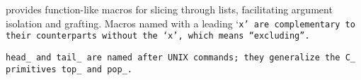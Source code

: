  provides function-like macros for slicing through lists,
facilitating argument isolation and grafting.
Macros named with a leading `\tt{x}' are complementary to their
counterparts without the `\tt{x}', which means ``e\textbf{\tt{x}}cluding''.

\note \tt{head_} and \tt{tail_} are named after UNIX commands;
they generalize the C\_ primitives \tt{top_} and \tt{pop_}.

\subsubsection{}


\subsubsection{}


\subsubsection{}


\subsubsection{}


\subsubsection{}


\subsubsection{}


\subsubsection{}


\subsubsection{}

